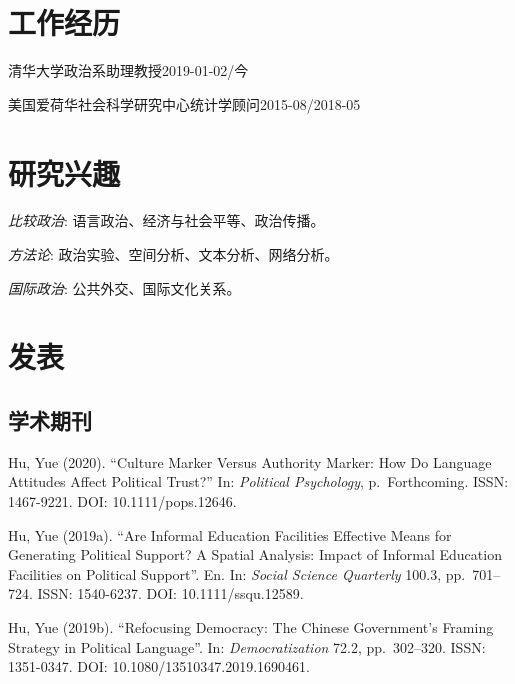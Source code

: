 \documentclass[10.5pt,]{article}
\providecommand{\tightlist}{%
	\setlength{\itemsep}{0pt}\setlength{\parskip}{0pt}}
\renewenvironment{itemize}{
	\begin{list}{}{
			\setlength{\leftmargin}{1.5em}
		}
	}{
	\end{list}
}
\begin{document}
\hypertarget{ux5de5ux4f5cux7ecfux5386}{%
\section{工作经历}\label{ux5de5ux4f5cux7ecfux5386}}

\begin{itemize}
\tightlist
\item
  清华大学政治系助理教授\hfill 2019-01-02/今
\item
  美国爱荷华社会科学研究中心统计学顾问\hfill 2015-08/2018-05
\end{itemize}

\hypertarget{ux7814ux7a76ux5174ux8da3}{%
\section{研究兴趣}\label{ux7814ux7a76ux5174ux8da3}}

\begin{itemize}
\tightlist
\item
  \emph{比较政治}: 语言政治、经济与社会平等、政治传播。
\item
  \emph{方法论}: 政治实验、空间分析、文本分析、网络分析。
\item
  \emph{国际政治}: 公共外交、国际文化关系。
\end{itemize}

\hypertarget{ux53d1ux8868}{%
\section{发表}\label{ux53d1ux8868}}

\hypertarget{ux5b66ux672fux671fux520a}{%
\subsection{学术期刊}\label{ux5b66ux672fux671fux520a}}

Hu, Yue (2020). ``Culture Marker Versus Authority Marker: How Do
Language Attitudes Affect Political Trust?'' In:
\emph{Political Psychology}, p.~Forthcoming. ISSN: 1467-9221. DOI:
10.1111/pops.12646.

Hu, Yue (2019a). ``Are Informal Education Facilities Effective Means for
Generating Political Support? A Spatial Analysis: Impact of Informal
Education Facilities on Political Support''. En. In:
\emph{Social Science Quarterly} 100.3, pp.~701--724. ISSN: 1540-6237.
DOI: 10.1111/ssqu.12589.

Hu, Yue (2019b). ``Refocusing Democracy: The Chinese Government's
Framing Strategy in Political Language''. In: \emph{Democratization}
72.2, pp.~302--320. ISSN: 1351-0347. DOI: 10.1080/13510347.2019.1690461.
\end{document}
